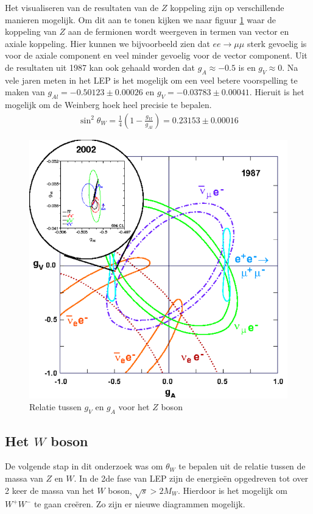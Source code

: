 \documentclass[../main.tex]{subfiles}
\begin{document}
Het visualiseren van de resultaten van de $Z$ koppeling zijn op verschillende manieren mogelijk. Om dit aan te tonen kijken we naar figuur \ref{fig:elektroweak_precision_tests/z_g_afhank} waar de koppeling van $Z$ aan de fermionen wordt weergeven in termen van vector en axiale koppeling. Hier kunnen we bijvoorbeeld zien dat $ee\rightarrow\mu\mu$ sterk gevoelig is voor de axiale component en veel minder gevoelig voor de vector component. Uit de resultaten uit 1987 kan ook gehaald worden dat $g_A \approx -0.5$ is en $g_V\approx 0$. Na vele jaren meten in het LEP is het mogelijk om een veel betere voorspelling te maken van $g_{Al} = -0.50123\pm0.00026$ en $g_V=-0.03783\pm0.00041$. Hieruit is het mogelijk om de Weinberg hoek heel precisie te bepalen.
\begin{equation}
    \begin{aligned}
        \label{eq:weinberg_hoek}
        \sin^2\theta_W = \frac{1}{4} \left( 1 - \frac{g_{Vl}}{g_{Al}} \right) = 0.23153 \pm 0.00016
    \end{aligned}
\end{equation}

\begin{figure}[h]
    \centering
    \includegraphics[width=0.4\linewidth]{elektroweak_precision_tests/z_g_afhank.png}
    \caption{Relatie tussen $g_V$ en $g_A$ voor het $Z$ boson}%
    \label{fig:elektroweak_precision_tests/z_g_afhank}
\end{figure}

\subsection{Het $W$ boson}%
\label{sub:het_w_boson}

De volgende stap in dit onderzoek was om $\theta_W$ te bepalen uit de relatie tussen de massa van $Z$ en $W$. In de 2de fase van LEP zijn de energieën opgedreven tot over 2 keer de massa van het $W$ boson, $\sqrt{s} > 2M_W$. Hierdoor is het mogelijk om  $W^+W^-$ te gaan creëren. Zo zijn er nieuwe diagrammen mogelijk.
\end{document}

